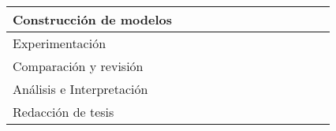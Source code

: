 \documentclass[
    left=2.0cm,         %
    right=2.0cm,        %
    top=2.0cm,          %
    bottom=2.5cm,         %
    bindingoffset=6mm,  %
    nohyphenation=false %
]{eiti/eiti-thesis}
\begin{document}
\begin{table}[h]
\begin{tabular}{|l|l|l|l|l|l|l|l|l|l|l|l|l|}
Construcción de modelos                        &                                                 &                                                 & \cellcolor[HTML]{000000} & \cellcolor[HTML]{000000} & \cellcolor[HTML]{000000}{\color[HTML]{000000} } &                          &                                                 &                                                 &                          &                                                 &                          &                          \\ \hline
Experimentación                                &                                                 &                                                 &                          &                          & \cellcolor[HTML]{000000}                        & \cellcolor[HTML]{000000} & \cellcolor[HTML]{000000}                        & \cellcolor[HTML]{000000}                        & \cellcolor[HTML]{000000} &                                                 &                          &                          \\ \hline
Comparación y revisión                         &                                                 &                                                 &                          &                          &                                                 &                          & \cellcolor[HTML]{FFFFFF}{\color[HTML]{000000} } & \cellcolor[HTML]{000000}{\color[HTML]{000000} } & \cellcolor[HTML]{000000} &                                                 &                          &                          \\ \hline
Análisis e Interpretación                      &                                                 &                                                 &                          &                          &                                                 &                          &                                                 &                                                 & \cellcolor[HTML]{000000} & \cellcolor[HTML]{000000}{\color[HTML]{000000} } &                          &                          \\ \hline
Redacción de tesis                             &                                                 &                                                 &                          &                          &                                                 &                          &                                                 &                                                 &                          & \cellcolor[HTML]{000000}{\color[HTML]{000000} } & \cellcolor[HTML]{000000} & \cellcolor[HTML]{000000} \\ \hline
\end{tabular}
\end{table}
\end{document}

